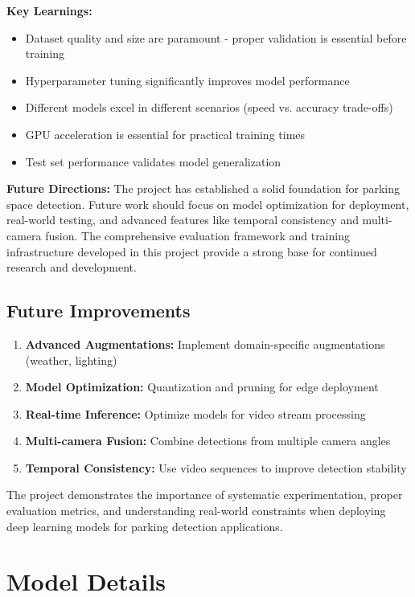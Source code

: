 \documentclass[12pt,a4paper]{article}
\begin{document}
\textbf{Key Learnings:}
\begin{itemize}
    \item Dataset quality and size are paramount - proper validation is essential before training
    \item Hyperparameter tuning significantly improves model performance
    \item Different models excel in different scenarios (speed vs. accuracy trade-offs)
    \item GPU acceleration is essential for practical training times
    \item Test set performance validates model generalization
\end{itemize}

\textbf{Future Directions:}
The project has established a solid foundation for parking space detection. Future work should focus on model optimization for deployment, real-world testing, and advanced features like temporal consistency and multi-camera fusion. The comprehensive evaluation framework and training infrastructure developed in this project provide a strong base for continued research and development.

\subsection{Future Improvements}

\begin{enumerate}
    \item \textbf{Advanced Augmentations:} Implement domain-specific augmentations (weather, lighting)
    \item \textbf{Model Optimization:} Quantization and pruning for edge deployment
    \item \textbf{Real-time Inference:} Optimize models for video stream processing
    \item \textbf{Multi-camera Fusion:} Combine detections from multiple camera angles
    \item \textbf{Temporal Consistency:} Use video sequences to improve detection stability
\end{enumerate}

The project demonstrates the importance of systematic experimentation, proper evaluation metrics, and understanding real-world constraints when deploying deep learning models for parking detection applications.

\newpage
\appendix
\section{Model Details}
\label{app:model_details}
\end{document}
